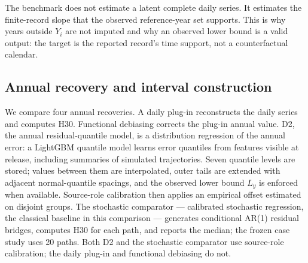 \begin{center}
\end{center}

The benchmark does not estimate a latent complete daily series. It estimates the finite-record slope that the observed reference-year set supports. This is why years outside $Y_i$ are not imputed and why an observed lower bound is a valid output: the target is the reported record's time support, not a counterfactual calendar.

\subsection{Annual recovery and interval construction}

We compare four annual recoveries. A daily plug-in reconstructs the daily series and computes $\mathrm{H30}$. Functional debiasing corrects the plug-in annual value. D2, the annual residual-quantile model, is a distribution regression of the annual error: a LightGBM quantile model learns error quantiles from features visible at release, including summaries of simulated trajectories. Seven quantile levels are stored; values between them are interpolated, outer tails are extended with adjacent normal-quantile spacings, and the observed lower bound $L_y$ is enforced when available. Source-role calibration then applies an empirical offset estimated on disjoint groups. The stochastic comparator --- calibrated stochastic regression, the classical baseline in this comparison --- generates conditional AR(1) residual bridges, computes $\mathrm{H30}$ for each path, and reports the median; the frozen case study uses 20 paths. Both D2 and the stochastic comparator use source-role calibration; the daily plug-in and functional debiasing do not.

